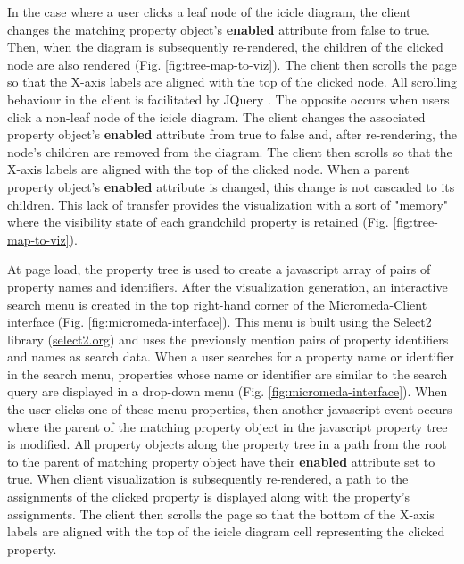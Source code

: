 In the case where a user clicks a leaf node of the icicle diagram, the client changes the matching property object's \textbf{enabled} attribute from false to true. Then, when the diagram is subsequently re-rendered, the children of the clicked node are also rendered (Fig. \ref{fig:tree-map-to-viz}). The client then scrolls the page so that the X-axis labels are aligned with the top of the clicked node. All scrolling behaviour in the client is facilitated by JQuery \cite{li2012jquery}. The opposite occurs when users click a non-leaf node of the icicle diagram. The client changes the associated property object's \textbf{enabled} attribute from true to false and, after re-rendering, the node's children are removed from the diagram. The client then scrolls so that the X-axis labels are aligned with the top of the clicked node. When a parent property object's \textbf{enabled} attribute is changed, this change is not cascaded to its children. This lack of transfer provides the visualization with a sort of "memory" where the visibility state of each grandchild property is retained (Fig. \ref{fig:tree-map-to-viz}).

At page load, the property tree is used to create a \gls{javascript} array of pairs of property names and identifiers. After the visualization generation, an interactive search menu is created in the top right-hand corner of the Micromeda-Client interface (Fig. \ref{fig:micromeda-interface}). This menu is built using the Select2 library \cite{select2} (\href{select2.org}{select2.org}) and uses the previously mention pairs of property identifiers and names as search data. When a user searches for a property name or identifier in the search menu, properties whose name or identifier are similar to the search query are displayed in a drop-down menu (Fig. \ref{fig:micromeda-interface}). When the user clicks one of these menu properties, then another \gls{javascript} event occurs where the parent of the matching property object in the \gls{javascript} property tree is modified. All property objects along the property tree in a path from the root to the parent of matching property object have their \textbf{enabled} attribute set to true. When client visualization is subsequently re-rendered, a path to the assignments of the clicked property is displayed along with the property's assignments. The client then scrolls the page so that the bottom of the X-axis labels are aligned with the top of the icicle diagram cell representing the clicked property.

